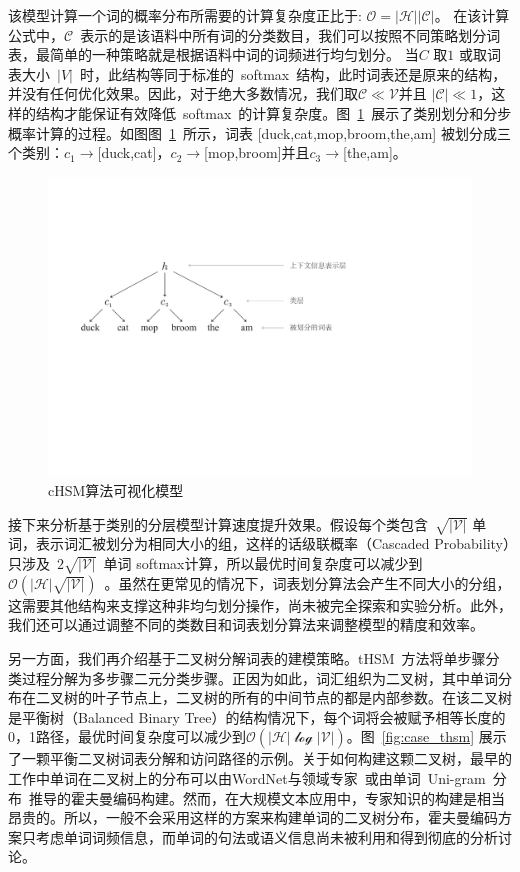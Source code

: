 该模型计算一个词的概率分布所需要的计算复杂度正比于: $\mathcal{O =|H||C|}$。 在该计算公式中，$\mathcal{C}$~表示的是该语料中所有词的分类数目，我们可以按照不同策略划分词表，最简单的一种策略就是根据语料中词的词频进行均匀划分。 当$C$ 取$1$ 或取词表大小~$|V|$~时，此结构等同于标准的~softmax~结构，此时词表还是原来的结构，并没有任何优化效果。因此，对于绝大多数情况，我们取$\mathcal{C} \ll \mathcal{V}$并且 $|\mathcal{C}|\ll 1$，这样的结构才能保证有效降低~softmax~的计算复杂度。图~\ref{fig:case_hsm}~展示了类别划分和分步概率计算的过程。如图图~\ref{fig:case_hsm}~所示，词表 [duck,cat,mop,broom,the,am] 被划分成三个类别：$c_1\to$[duck,cat]，$c_2\to$[mop,broom]并且$c_3\to$[the,am]。
\begin{figure}[!t]
  \centering
\includegraphics[width=.9\linewidth]{./figures/case_chsm.pdf}
\caption{cHSM算法可视化模型}\label{fig:case_hsm}
\end{figure}

接下来分析基于类别的分层模型计算速度提升效果。假设每个类包含~$\sqrt{\mathcal{|V|}}$ 单词，表示词汇被划分为相同大小的组，这样的话级联概率（Cascaded Probability）只涉及~$2\sqrt{\mathcal{|V|}}$~单词 softmax计算，所以最优时间复杂度可以减少到~$\mathcal{O}(\mathcal{|H|}\sqrt{\mathcal{|V|}})$~。虽然在更常见的情况下，词表划分算法会产生不同大小的分组，这需要其他结构来支撑这种非均匀划分操作，尚未被完全探索和实验分析。此外，我们还可以通过调整不同的类数目和词表划分算法来调整模型的精度和效率。

另一方面，我们再介绍基于二叉树分解词表的建模策略。tHSM~方法将单步骤分类过程分解为多步骤二元分类步骤。正因为如此，词汇组织为二叉树，其中单词分布在二叉树的叶子节点上，二叉树的所有的中间节点的都是内部参数。在该二叉树是平衡树（Balanced Binary Tree）的结构情况下，每个词将会被赋予相等长度的0，1路径，最优时间复杂度可以减少到$\mathcal{O(|H|\log \mathcal{|V|})}$。图~\ref{fig:case_thsm} 展示了一颗平衡二叉树词表分解和访问路径的示例。关于如何构建这颗二叉树，最早的工作中单词在二叉树上的分布可以由WordNet与领域专家~或由单词~Uni-gram~分布~推导的霍夫曼编码构建。然而，在大规模文本应用中，专家知识的构建是相当昂贵的。所以，一般不会采用这样的方案来构建单词的二叉树分布，霍夫曼编码方案只考虑单词词频信息，而单词的句法或语义信息尚未被利用和得到彻底的分析讨论。


